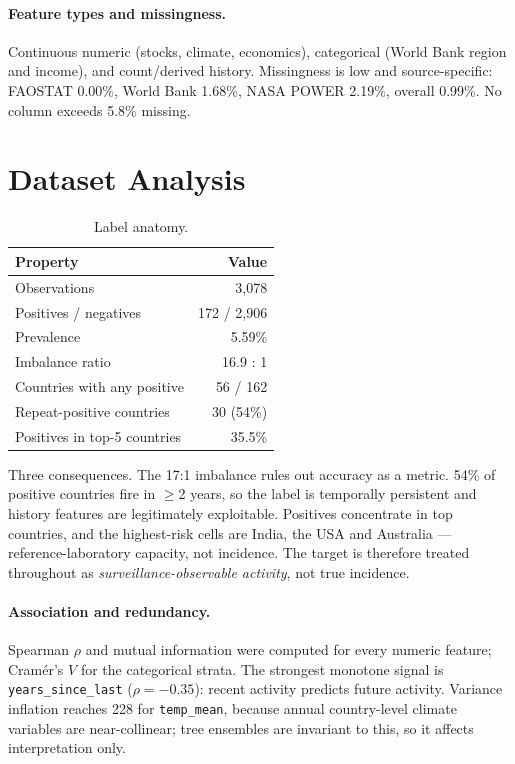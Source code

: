 \documentclass[11pt]{article}
\begin{document}
\paragraph{Feature types and missingness.} Continuous numeric (stocks, climate, economics),
categorical (World Bank region and income), and count/derived history. Missingness is low and
source-specific: FAOSTAT 0.00\%, World Bank
1.68\%, NASA POWER
2.19\%, overall 0.99\%. No column
exceeds 5.8\% missing.

\section{Dataset Analysis}

\begin{table}[H]
\centering
\caption{Label anatomy.}
\small
\begin{tabular}{@{}lr@{}}
\toprule
\textbf{Property} & \textbf{Value} \\
\midrule
Observations & 3,078 \\
Positives / negatives & 172 / 2,906 \\
Prevalence & 5.59\% \\
Imbalance ratio & 16.9 : 1 \\
Countries with any positive & 56 / 162 \\
Repeat-positive countries & 30 (54\%) \\
Positives in top-5 countries & 35.5\% \\
\bottomrule
\end{tabular}
\end{table}

\noindent
Three consequences. The 17:1 imbalance rules out accuracy as a metric.
54\% of positive countries fire in $\geq$2 years, so the label is
temporally persistent and history features are legitimately exploitable. Positives concentrate in
top countries, and the highest-risk cells are India, the USA and Australia --- reference-laboratory
capacity, not incidence. The target is therefore treated throughout as
\emph{surveillance-observable activity}, not true incidence.

\paragraph{Association and redundancy.} Spearman $\rho$ and mutual information were computed for
every numeric feature; Cram\'er's $V$ for the categorical strata. The strongest monotone signal is
\texttt{years\_since\_last} ($\rho=-0.35$): recent activity predicts future activity. Variance
inflation reaches 228 for \texttt{temp\_mean},
because annual country-level climate variables are near-collinear; tree ensembles are invariant to
this, so it affects interpretation only.
\end{document}
